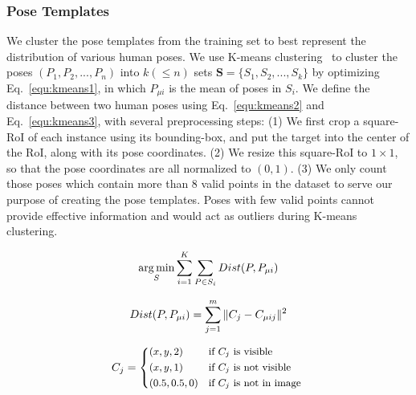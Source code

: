 \documentclass[10pt,twocolumn,letterpaper]{article}
\begin{document}
\subsubsection{Pose Templates}
We cluster the pose templates from the training set to best represent the distribution of various human poses. We use K-means clustering~\cite{forgy1965cluster} to cluster the poses $(P_1,P_2,...,P_n)$ into $k(\leq n)$ sets $\mathbf{S}=\{S_1,S_2,...,S_k\}$ by optimizing Eq.~\ref{equ:kmeans1}, in which $P_{\mu i}$ is the mean of poses in $S_i$. We define the distance between two human poses using Eq.~\ref{equ:kmeans2} and Eq.~\ref{equ:kmeans3}, with several preprocessing steps: 
(1) We first crop a square-RoI of each instance using its bounding-box, and put the target into the center of the RoI, along with its pose coordinates.
(2) We resize this square-RoI to $1 \times 1$, so that the pose coordinates are all normalized to $(0, 1)$.
(3) We only count those poses which contain more than 8 valid points in the dataset to serve our purpose of creating the pose templates. Poses with few valid points cannot provide effective information and would act as outliers during K-means clustering.

\vspace{-0.3cm}
\begin{equation}
\small
\label{equ:kmeans1}
\mathop{\arg\min}_{S}\sum_{i=1}^K\sum_{P\in S_{i}} Dist(P, P_{\mu i})
\end{equation}

\begin{equation}
\small
\label{equ:kmeans2}
Dist(P, P_{\mu i})=\sum_{j=1}^m \|C_{j}-C_{\mu ij}\|^{2}
\end{equation}

\begin{equation}
\small
\label{equ:kmeans3}
C_{j} = 
\begin{cases*}
(x, y, 2) & if $C_{j}$ is visible  \\
(x, y, 1) & if $C_{j}$ is not visible\\
(0.5, 0.5, 0) & if $C_{j}$ is not in image 
\end{cases*} 
\end{equation}
\vspace{0.1cm}
\end{document}
